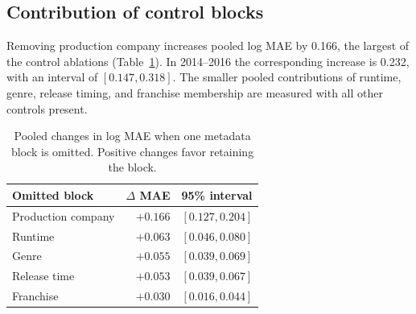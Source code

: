 \subsection{Contribution of control blocks}

Removing production company increases pooled log MAE by 0.166, the largest
of the control ablations (Table~\ref{tab:controls}). In 2014--2016 the
corresponding increase is 0.232, with an interval of $[0.147, 0.318]$.
The smaller pooled contributions of runtime, genre, release timing, and
franchise membership are measured with all other controls present.

\begin{table}[htbp]
  \centering
  \caption{Pooled changes in log MAE when one metadata block is omitted.
  Positive changes favor retaining the block.}
  \label{tab:controls}
  \begin{tabular}{@{}lrl@{}}
    \toprule
    Omitted block & $\Delta$ MAE & 95\% interval \\
    \midrule
    Production company & $+0.166$ & $[0.127, 0.204]$ \\
    Runtime & $+0.063$ & $[0.046, 0.080]$ \\
    Genre & $+0.055$ & $[0.039, 0.069]$ \\
    Release time & $+0.053$ & $[0.039, 0.067]$ \\
    Franchise & $+0.030$ & $[0.016, 0.044]$ \\
    \bottomrule
  \end{tabular}
\end{table}

